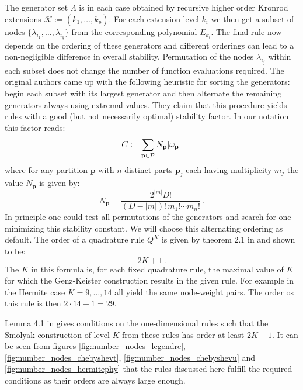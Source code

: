 \documentclass[a4paper,10pt]{article}
\begin{document}
The generator set $\Lambda$ is in each case obtained by recursive higher order
Kronrod extensions $\mathcal{K} := (k_1, \ldots, k_p)$. For each extension level $k_i$
we then get a subset of nodes $\{\lambda_{i_1}, \ldots, \lambda_{i_q}\}$ from the corresponding
polynomial $E_{k_i}$. The final rule now depends on the ordering of these generators
and different orderings can lead to a non-negligible difference in overall stability. Permutation of
the nodes $\lambda_{i_j}$ within each subset does not change the number of function evaluations
required. The original authors came up with the following heuristic for sorting the
generators: begin each subset with its largest generator and then alternate the remaining
generators always using extremal values. They claim that this procedure yields
rules with a good (but not necessarily optimal) stability factor. In our notation
this factor reads:
\begin{equation*}
  C := \sum_{\mathbf{p} \in \mathcal{P}} N_{\mathbf{p}} |\omega_{\mathbf{p}}|
\end{equation*}
where for any partition $\mathbf{p}$ with $n$ distinct parts $\mathbf{p}_j$ each
having multiplicity $m_j$ the value $N_{\mathbf{p}}$ is given by:
\begin{equation*}
  N_{\mathbf{p}} = \frac{2^{|m|} D!}
                        {(D-|m|)! \, m_1! \cdots m_n!} \,.
\end{equation*}
In principle one could test all permutations of the generators and search for
one minimizing this stability constant. We will choose this alternating ordering
as default.
The order of a quadrature rule $Q^K$ is given by theorem 2.1 in \cite{genz}
and shown to be:
\begin{equation} \label{eq:gk_rul_order}
  2 K + 1 \,.
\end{equation}
The $K$ in this formula is, for each fixed quadrature
rule, the maximal value of $K$ for which the Genz-Keister construction results
in the given rule. For example in the Hermite case $K=9, \ldots, 14$ all yield
the same node-weight pairs. The order os this rule is then $2\cdot 14 + 1 = 29$.

Lemma 4.1 in \cite{holtz} gives conditions on the one-dimensional rules
such that the Smolyak construction of level $K$ from these rules has
order at least $2K-1$. It can be seen from figures \ref{fig:number_nodes_legendre},
\ref{fig:number_nodes_chebyshevt}, \ref{fig:number_nodes_chebyshevu} and
\ref{fig:number_nodes_hermitephy} that the rules discussed here fulfill the
required conditions as their orders are always large enough.
\end{document}
